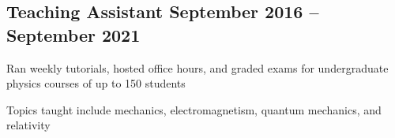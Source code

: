 \documentclass[letter,10pt]{article}
\begin{document}
\subsection{{Teaching Assistant  \hfill September 2016 – September 2021}}
\begin{zitemize}
\item Ran weekly tutorials, hosted office hours, and graded exams for undergraduate physics courses of up to 150 students
\item Topics taught include mechanics, electromagnetism, quantum mechanics, and relativity
\end{zitemize}
\end{document}
